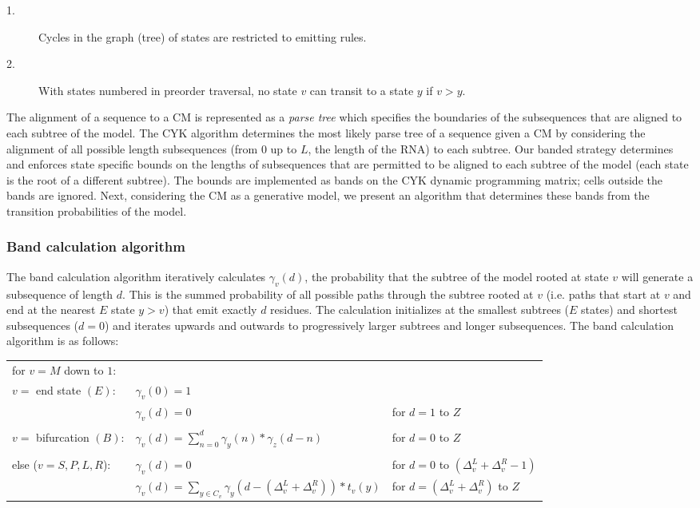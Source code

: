 \documentclass[11pt]{article}
\begin{document}
\begin{description}
\item[1.] Cycles in the graph (tree) of states are restricted to emitting
  rules. 
\item[2.] With states numbered in preorder traversal, no state
  $v$ can transit to a state $y$ if $v > y$.
\end{description}

The alignment of a sequence to a CM is represented as a \emph{parse
tree} which specifies the boundaries of the subsequences that are
aligned to each subtree of the model. The CYK algorithm determines the
most likely parse tree of a sequence
given a CM by considering the alignment of all possible length
subsequences (from $0$ up to $L$, the length of the RNA)
to each subtree. Our banded strategy determines and
enforces state specific bounds on the lengths of subsequences that
are permitted to be aligned to each subtree of the model (each state
is the root of a different subtree). The bounds are implemented as
bands on the CYK dynamic programming matrix; cells outside the bands
are ignored. 
Next, considering the CM as a generative model, we present an
algorithm that determines these bands from the transition
probabilities of the model.

\subsubsection{Band calculation algorithm}
The band calculation algorithm iteratively calculates
$\gamma_v(d)$, the probability that the subtree of the model rooted at state $v$
will generate a subsequence of length $d$. This is the summed probability
of all possible paths through the subtree rooted at $v$ (i.e. paths
that start at $v$ and end at the nearest $E$ state $y > v$) that emit
exactly $d$ residues. 
The calculation initializes at the smallest subtrees ($E$ states) and
shortest subsequences ($d=0$) and iterates upwards and outwards to
progressively larger subtrees and longer subsequences. The band calculation algorithm is as follows:

\vspace{0.5em}
\begin{tabular}{l|l|l}
\multicolumn{3}{l}{for $v = M$ down to $1$:} \\
$v = $ end state $(E)$: & $\gamma_v(0) = 1$ & \\
                        & $\gamma_v(d) = 0$ & for $d=1$ to $Z$ \\
& & \\
$v = $ bifurcation $(B)$: & $\gamma_v(d) = \sum_{n=0}^{d} \gamma_y(n)
* \gamma_z(d-n)$ & for $d = 0$ to $Z$ \\
& & \\
else ($v = S, P, L, R$): & $\gamma_v(d) = 0$ & for $d=0$ to $(\Delta_v^{L} + \Delta_v^{R} -
1)$ \\
& $\gamma_v(d) = \sum_{y \in C_v} \gamma_y(d-(\Delta_v^{L} + \Delta_v^{R})) * t_v(y) $ 
& for $d = (\Delta_v^{L} + \Delta_v^{R})$ to $Z$ \\
\end{tabular}
\vspace{0.5em}
\end{document}

